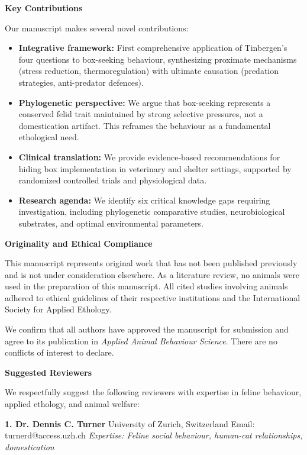 \documentclass[11pt]{letter}
\begin{document}
\begin{letter}
\textbf{Key Contributions}

Our manuscript makes several novel contributions:

\begin{itemize}
    \item \textbf{Integrative framework:} First comprehensive application of Tinbergen's four questions to box-seeking behaviour, synthesizing proximate mechanisms (stress reduction, thermoregulation) with ultimate causation (predation strategies, anti-predator defences).
    
    \item \textbf{Phylogenetic perspective:} We argue that box-seeking represents a conserved felid trait maintained by strong selective pressures, not a domestication artifact. This reframes the behaviour as a fundamental ethological need.
    
    \item \textbf{Clinical translation:} We provide evidence-based recommendations for hiding box implementation in veterinary and shelter settings, supported by randomized controlled trials and physiological data.
    
    \item \textbf{Research agenda:} We identify six critical knowledge gaps requiring investigation, including phylogenetic comparative studies, neurobiological substrates, and optimal environmental parameters.
\end{itemize}

\textbf{Originality and Ethical Compliance}

This manuscript represents original work that has not been published previously and is not under consideration elsewhere. As a literature review, no animals were used in the preparation of this manuscript. All cited studies involving animals adhered to ethical guidelines of their respective institutions and the International Society for Applied Ethology.

We confirm that all authors have approved the manuscript for submission and agree to its publication in \textit{Applied Animal Behaviour Science}. There are no conflicts of interest to declare.

\textbf{Suggested Reviewers}

We respectfully suggest the following reviewers with expertise in feline behaviour, applied ethology, and animal welfare:

\textbf{1. Dr. Dennis C. Turner}  
University of Zurich, Switzerland  
Email: turnerd@access.uzh.ch  
\textit{Expertise: Feline social behaviour, human-cat relationships, domestication}


\end{letter}
\end{document}
